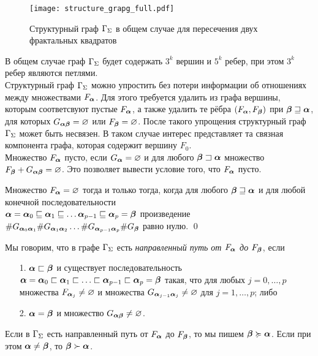 \begin{figure}[h!]
    \centering
    \texttt{[image: structure\_grapg\_full.pdf]}
    \caption{Структурный граф $\Gamma_\Sigma$ в общем случае для пересечения двух фрактальных квадратов}
\end{figure}

В общем случае граф $\Gamma_\Sigma$ будет содержать $3^k$ вершин и $5^k$ ребер, при этом $3^k$ ребер являются петлями.\\

Структурный граф $\Gamma_\Sigma$ можно упростить без потери информации об отношениях между множествами $F_{\bm{\alpha}}$.
Для этого требуется удалить из графа вершины, которым соответсвуют пустые $F_{\bm{\alpha}}$, а также удалить те рёбра $(F_{\bm{\alpha}},F_{\bm{\beta}})$ при ${\bm{\beta}}\sqsupseteq{\bm{\alpha}}$, для которых $G_{{\bm{\alpha}}{\bm{\beta}}}=\varnothing$ или $F_{\bm{\beta}}=\varnothing$.
После такого упрощения структурный граф $\Gamma_\Sigma$ может быть несвязен.
В таком случае интерес представляет та связная компонента графа, которая содержит вершину $F_0$.\\

Множество $F_{\bm{\alpha}}$ пусто, если $G_{\bm{\alpha}}=\varnothing$ и для любого ${\bm{\beta}}\sqsupset{\bm{\alpha}}$ множество $F_{\bm{\beta}}+G_{{\bm{\alpha}}{\bm{\beta}}}=\varnothing$.
Это позволяет вывести условие того, что $F_{\bm{\alpha}}$ пусто.

\begin{lemma}
Множество $F_{\bm{\alpha}}=\varnothing$ тогда и только тогда, когда для любого ${\bm{\beta}}\sqsupseteq{\bm{\alpha}}$ и для любой конечной последовательности\\ ${\bm{\alpha}}={\bm{\alpha}}_0\sqsubseteq{\bm{\alpha}}_1\sqsubseteq\ldots {\bm{\alpha}}_{p-1}\sqsubseteq{\bm{\alpha}}_p={\bm{\beta}}$ произведение 
$\#G_{{\bm{\alpha}}_0{\bm{\alpha}}_1}\#G_{{\bm{\alpha}}_1{\bm{\alpha}}_2}\ldots  \#G_{{\bm{\alpha}}_{p-1}{\bm{\alpha}}_p}\#G_{{\bm{\beta}}}$ равно нулю. 
\qed
\end{lemma} 

\begin{definition}
Мы говорим, что в графе $\Gamma_\Sigma$  есть {\em направленный путь от $F_{\bm{\alpha}}$ до $F_{\bm{\beta}}$}, если 
\begin{itemize}[nolistsep]
\item[1.] ${\bm{\alpha}}\sqsubset{\bm{\beta}}$ и существует последовательность ${\bm{\alpha}}={\bm{\alpha}}_0\sqsubset{\bm{\alpha}}_1\sqsubset\ldots\sqsubset{\bm{\alpha}}_{p-1}\sqsubset{\bm{\alpha}}_p={\bm{\beta}}$ такая, что для любых  $j=0, \ldots, p$ множества $F_{{\bm{\alpha}}_j}\neq\varnothing$  и множества $G_{{\bm{\alpha}}_{j-1}{\bm{\alpha}}_j}\neq\varnothing$ для $j=1, \ldots, p$; либо
\item[2.] ${\bm{\alpha}}={\bm{\beta}}$ и множество $G_{{\bm{\alpha}}{\bm{\beta}}}\neq\varnothing$.
\end{itemize}
Если в $\Gamma_\Sigma$ есть направленный путь от $F_{\bm{\alpha}}$ до $F_{\bm{\beta}}$, то мы пишем ${\bm{\beta}}\succcurlyeq{\bm{\alpha}}$.
Если при этом ${\bm{\alpha}}\neq{\bm{\beta}}$, то ${\bm{\beta}}\succ{\bm{\alpha}}$.
\end{definition}

